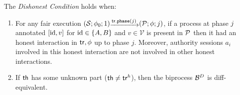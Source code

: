 \begin{condi}[Dishonest]
The {\em Dishonest Condition} holds when:
\begin{enumerate}
\item 
  For any fair execution $(\S;\phi_0;1)\sint{\tr.\mathtt{phase}(j)}(\p;\phi;j)$, if a process at phase $j$
  annotated $[\mathrm{id},v]$ for
  $\mathrm{id}\in\{A,B\}$ and $v\in\mathcal{V}$ is present in $\mathcal{P}$ then it had an honest interaction in $\mathsf{tr},\phi$ up to phase $j$.
  Moreover, authority sessions $a_i$ involved in this honest interaction
  are not involved in other honest interactions.
\item If $\mathsf{th}$ has some unknown part (\ie $\mathsf{th}\neq\mathsf{tr}^h$), then
  the biprocess $\mathcal{B}^D$ is diff-equivalent.
\end{enumerate}
\end{condi}


%

